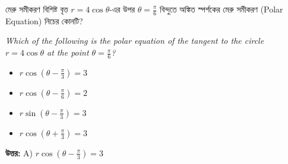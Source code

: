 \documentclass[12pt, a4paper]{article}
\begin{document}
\vspace{2em}

\begin{tcolorbox}[questionbox={প্রশ্ন (Question) 26}]
    \noindent
    মেরু সমীকরণ বিশিষ্ট বৃত্ত $r = 4\cos\theta$-এর উপর $\theta = \frac{\pi}{6}$ বিন্দুতে অঙ্কিত স্পর্শকের মেরু সমীকরণ (Polar Equation) নিচের কোনটি?
    
    \vspace{0.8em}
    \begin{english}
    \noindent\textit{\color{darkgray}
    Which of the following is the polar equation of the tangent to the circle $r = 4\cos\theta$ at the point $\theta = \frac{\pi}{6}$?
    }
    \end{english}
\end{tcolorbox}

\begin{itemize}[label={}, leftmargin=1cm, itemsep=0.5em]
    \item[\textbf{A)}] $r\cos\left(\theta - \frac{\pi}{3}\right) = 3$
    \item[\textbf{B)}] $r\cos\left(\theta - \frac{\pi}{6}\right) = 2$
    \item[\textbf{C)}] $r\sin\left(\theta - \frac{\pi}{3}\right) = 3$
    \item[\textbf{D)}] $r\cos\left(\theta + \frac{\pi}{3}\right) = 3$
\end{itemize}

\vspace{0.5em}
\begin{tcolorbox}[answerbox]
    \textbf{\color{success} উত্তর:} A) $r\cos\left(\theta - \frac{\pi}{3}\right) = 3$
\end{tcolorbox}
\vspace{1em}
\end{document}
